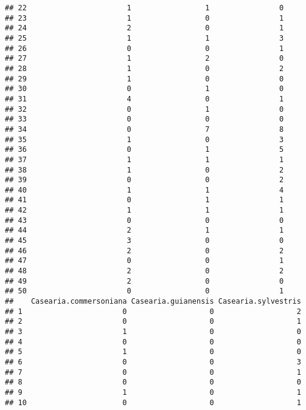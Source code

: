 \documentclass[
]{article}
\begin{document}
\begin{verbatim}
## 22                       1                 1                0
## 23                       1                 0                1
## 24                       2                 0                1
## 25                       1                 1                3
## 26                       0                 0                1
## 27                       1                 2                0
## 28                       1                 0                2
## 29                       1                 0                0
## 30                       0                 1                0
## 31                       4                 0                1
## 32                       0                 1                0
## 33                       0                 0                0
## 34                       0                 7                8
## 35                       1                 0                3
## 36                       0                 1                5
## 37                       1                 1                1
## 38                       1                 0                2
## 39                       0                 0                2
## 40                       1                 1                4
## 41                       0                 1                1
## 42                       1                 1                1
## 43                       0                 0                0
## 44                       2                 1                1
## 45                       3                 0                0
## 46                       2                 0                2
## 47                       0                 0                1
## 48                       2                 0                2
## 49                       2                 0                0
## 50                       0                 0                1
##    Casearia.commersoniana Casearia.guianensis Casearia.sylvestris
## 1                       0                   0                   2
## 2                       0                   0                   1
## 3                       1                   0                   0
## 4                       0                   0                   0
## 5                       1                   0                   0
## 6                       0                   0                   3
## 7                       0                   0                   1
## 8                       0                   0                   0
## 9                       1                   0                   1
## 10                      0                   0                   1

\end{verbatim}
\end{document}
